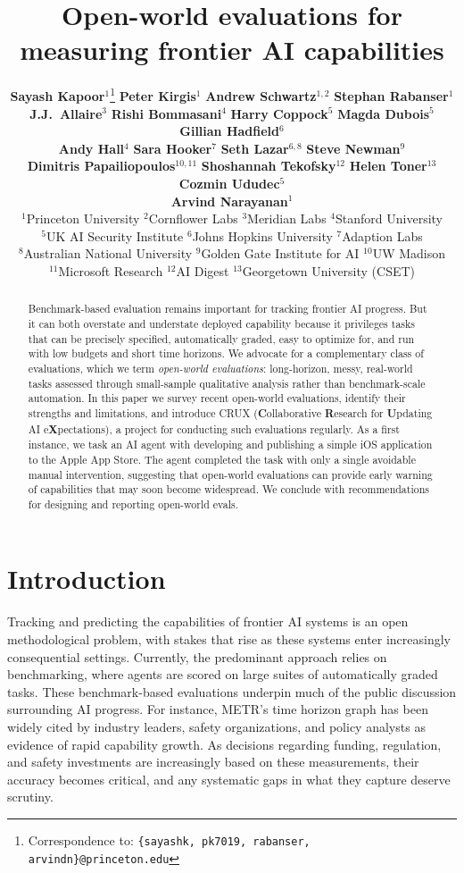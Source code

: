 \documentclass{article}
\title{Open-world evaluations for measuring frontier AI capabilities}
\author{%
\textbf{Sayash Kapoor}$^{1}$\thanks{Correspondence to: \texttt{\{sayashk, pk7019, rabanser, arvindn\}@princeton.edu}} \quad \textbf{Peter Kirgis}$^{1}$ \quad \textbf{Andrew Schwartz}$^{1,2}$ \quad \textbf{Stephan Rabanser}$^{1}$ \\
\textbf{J.J.~Allaire}$^{3}$ \quad \textbf{Rishi Bommasani}$^{4}$ \quad \textbf{Harry Coppock}$^{5}$ \quad \textbf{Magda Dubois}$^{5}$ \quad \textbf{Gillian Hadfield}$^{6}$ \\
\textbf{Andy Hall}$^{4}$ \quad \textbf{Sara Hooker}$^{7}$ \quad \textbf{Seth Lazar}$^{6,8}$ \quad \textbf{Steve Newman}$^{9}$ \\
\textbf{Dimitris Papailiopoulos}$^{10,11}$ \quad \textbf{Shoshannah Tekofsky}$^{12}$ \quad \textbf{Helen Toner}$^{13}$ \quad \textbf{Cozmin Ududec}$^{5}$ \\
\textbf{Arvind Narayanan}$^{1}$ \\
{\normalfont\small $^{1}$Princeton University \quad $^{2}$Cornflower Labs \quad $^{3}$Meridian Labs \quad $^{4}$Stanford University} \\
{\normalfont\small $^{5}$UK AI Security Institute \quad $^{6}$Johns Hopkins University \quad $^{7}$Adaption Labs} \\
{\normalfont\small $^{8}$Australian National University \quad $^{9}$Golden Gate Institute for AI \quad $^{10}$UW Madison} \\
{\normalfont\small $^{11}$Microsoft Research \quad $^{12}$AI Digest \quad $^{13}$Georgetown University (CSET)}
}
\newcounter{recommendation}
\begin{document}
\renewcommand{\thefootnote}{\fnsymbol{footnote}}
\maketitle
\setcounter{footnote}{0}
\renewcommand{\thefootnote}{\arabic{footnote}}

\begin{abstract}
Benchmark-based evaluation remains important for tracking frontier AI progress. But it can both overstate and understate deployed capability because it privileges tasks that can be precisely specified, automatically graded, easy to optimize for, and run with low budgets and short time horizons. We advocate for a complementary class of evaluations, which we term \emph{open-world evaluations}: long-horizon, messy, real-world tasks assessed through small-sample qualitative analysis rather than benchmark-scale automation. In this paper we survey recent open-world evaluations, identify their strengths and limitations, and introduce CRUX (\textbf{C}ollaborative \textbf{R}esearch for \textbf{U}pdating AI e\textbf{X}pectations), a project for conducting such evaluations regularly. As a first instance, we task an AI agent with developing and publishing a simple iOS application to the Apple App Store. The agent completed the task with only a single avoidable manual intervention, suggesting that open-world evaluations can provide early warning of capabilities that may soon become widespread. We conclude with recommendations for designing and reporting open-world evals.
\end{abstract}

\section{Introduction}

Tracking and predicting the capabilities of frontier AI systems is an open methodological problem, with stakes that rise as these systems enter increasingly consequential settings. Currently, the predominant approach relies on benchmarking, where agents are scored on large suites of automatically graded tasks. These benchmark-based evaluations underpin much of the public discussion surrounding AI progress. For instance, METR's time horizon graph \citep{metrOrgTimeHorizons} has been widely cited by industry leaders, safety organizations, and policy analysts as evidence of rapid capability growth. As decisions regarding funding, regulation, and safety investments are increasingly based on these measurements, their accuracy becomes critical, and any systematic gaps in what they capture deserve scrutiny.
\end{document}

